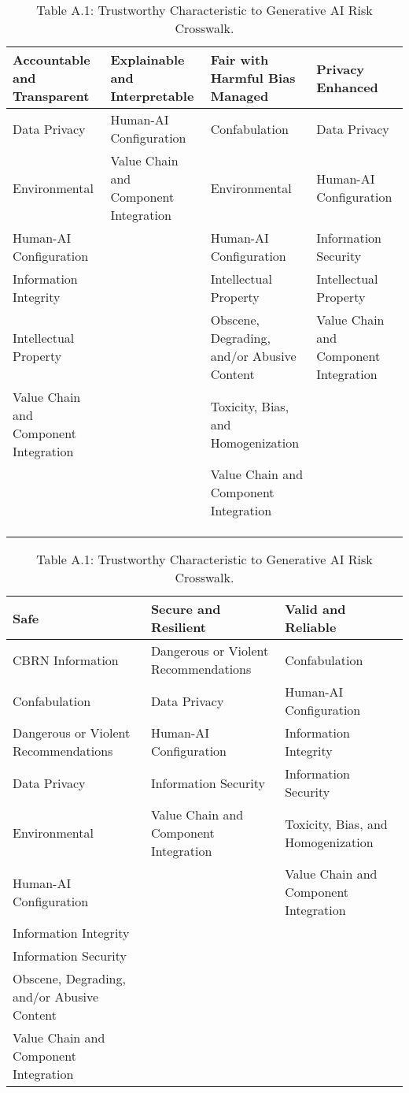 \documentclass[fleqn]{article}
\begin{document}
\begin{landscape}
\begin{table}[H]
	\caption*{Table A.1: Trustworthy Characteristic to Generative AI Risk Crosswalk.}
	\label{tab:tc_to_gai_risk_cw}
	\footnotesize
	\begin{tabular}{llll}
		\toprule
		\textbf{Accountable and Transparent} & \textbf{Explainable and Interpretable} & \textbf{Fair with Harmful Bias Managed} & \textbf{Privacy Enhanced} \\
		\midrule
		Data Privacy & Human-AI Configuration & Confabulation & Data Privacy \\
		Environmental & Value Chain and Component Integration & Environmental & Human-AI Configuration \\
		Human-AI Configuration &  & Human-AI Configuration & Information Security \\
		Information Integrity &  & Intellectual Property & Intellectual Property \\
		Intellectual Property &  & Obscene, Degrading, and/or Abusive Content & Value Chain and Component Integration \\
		Value Chain and Component Integration &  & Toxicity, Bias, and Homogenization &  \\
 		&  & Value Chain and Component Integration &  \\
 		&  &  &  \\
 		&  &  &  \\
 		&  &  &  \\
		\bottomrule
	\end{tabular}
	\newline
	\vspace{10pt}
	\newline
	\begin{tabular}{lll}
		\toprule
		\textbf{Safe} & \textbf{Secure and Resilient} & \textbf{Valid and Reliable} \\
		\midrule
		CBRN Information & Dangerous or Violent Recommendations & Confabulation \\
		Confabulation & Data Privacy & Human-AI Configuration \\
		Dangerous or Violent Recommendations & Human-AI Configuration & Information Integrity \\
		Data Privacy & Information Security & Information Security \\
		Environmental & Value Chain and Component Integration & Toxicity, Bias, and Homogenization \\
		Human-AI Configuration &  & Value Chain and Component Integration \\
		Information Integrity &  &  \\
		Information Security &  &  \\
		Obscene, Degrading, and/or Abusive Content &  &  \\
		Value Chain and Component Integration &  &  \\
		\bottomrule
	\end{tabular}
\end{table}


\end{landscape}
\end{document}
